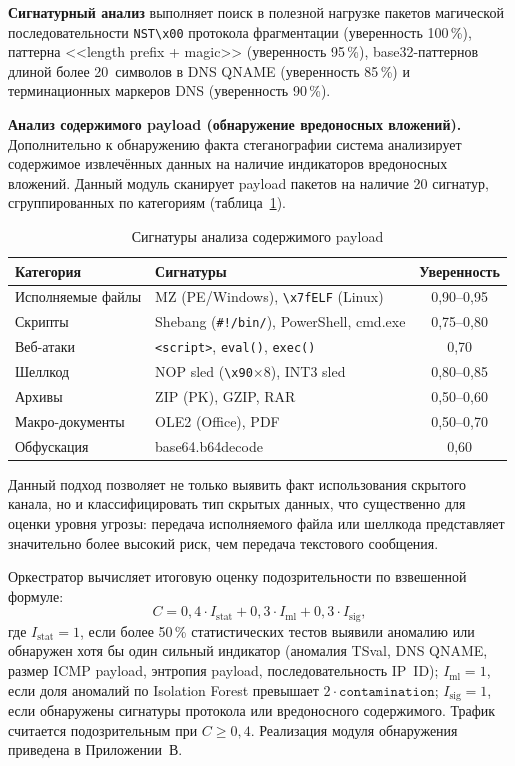 \textbf{Сигнатурный анализ} выполняет поиск в полезной нагрузке пакетов магической последовательности \texttt{NST\textbackslash x00} протокола фрагментации (уверенность 100\,\%), паттерна <<length prefix + magic>> (уверенность 95\,\%), base32-паттернов длиной более 20~символов в DNS QNAME (уверенность 85\,\%) и терминационных маркеров DNS (уверенность 90\,\%).

\textbf{Анализ содержимого payload (обнаружение вредоносных вложений).} Дополнительно к обнаружению факта стеганографии система анализирует содержимое извлечённых данных на наличие индикаторов вредоносных вложений. Данный модуль сканирует payload пакетов на наличие 20 сигнатур, сгруппированных по категориям (таблица~\ref{tab:content_sigs}).

\begin{table}[htb]
\centering
\caption{Сигнатуры анализа содержимого payload}
\label{tab:content_sigs}
\begin{tabular}{|l|l|c|}
\hline
Категория & Сигнатуры & Уверенность \\
\hline
Исполняемые файлы  & MZ (PE/Windows), \texttt{\textbackslash x7fELF} (Linux) & 0{,}90--0{,}95 \\
Скрипты            & Shebang (\texttt{\#!/bin/}), PowerShell, cmd.exe & 0{,}75--0{,}80 \\
Веб-атаки          & \texttt{<script>}, \texttt{eval()}, \texttt{exec()} & 0{,}70 \\
Шеллкод            & NOP sled (\texttt{\textbackslash x90}$\times$8), INT3 sled & 0{,}80--0{,}85 \\
Архивы             & ZIP (PK), GZIP, RAR & 0{,}50--0{,}60 \\
Макро-документы    & OLE2 (Office), PDF & 0{,}50--0{,}70 \\
Обфускация         & base64.b64decode & 0{,}60 \\
\hline
\end{tabular}
\end{table}

Данный подход позволяет не только выявить факт использования скрытого канала, но и классифицировать тип скрытых данных, что существенно для оценки уровня угрозы: передача исполняемого файла или шеллкода представляет значительно более высокий риск, чем передача текстового сообщения.

Оркестратор вычисляет итоговую оценку подозрительности по взвешенной формуле:
\begin{equation}
C = 0{,}4 \cdot I_{\text{stat}} + 0{,}3 \cdot I_{\text{ml}} + 0{,}3 \cdot I_{\text{sig}},
\label{eq:confidence}
\end{equation}
где $I_{\text{stat}} = 1$, если более 50\,\% статистических тестов выявили аномалию или обнаружен хотя бы один сильный индикатор (аномалия TSval, DNS QNAME, размер ICMP payload, энтропия payload, последовательность IP~ID); $I_{\text{ml}} = 1$, если доля аномалий по Isolation Forest превышает $2 \cdot \texttt{contamination}$; $I_{\text{sig}} = 1$, если обнаружены сигнатуры протокола или вредоносного содержимого. Трафик считается подозрительным при $C \geq 0{,}4$. Реализация модуля обнаружения приведена в Приложении~В.

